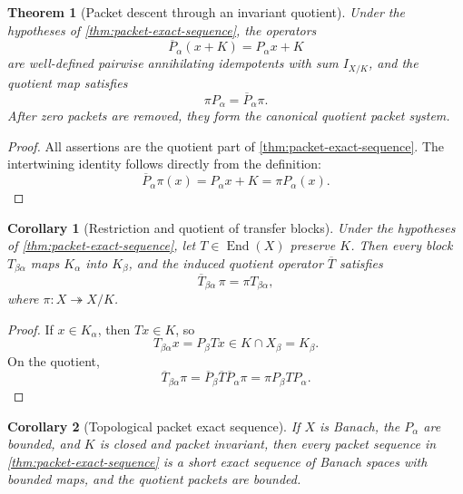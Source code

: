\documentclass[11pt]{article}
\newtheorem{theorem}{Theorem}[section]
\newtheorem{corollary}[corollary]{Corollary}
\theoremstyle{definition}
\theoremstyle{remark}
\theoremstyle{definition}\newtheorem{example}[theorem]{Example}
\newcommand{\End}{\operatorname{End}}
\newcommand{\RecordID}[1]{\label{record:#1}}
\newcommand{\Depends}[1]{}
\begin{document}
\begin{theorem}[Packet descent through an invariant quotient]
\label{thm:quotient-packet-descent}
Under the hypotheses of \cref{thm:packet-exact-sequence}, the operators
\[
\overline P_\alpha(x+K)=P_\alpha x+K
\]
are well-defined pairwise annihilating idempotents with sum $I_{X/K}$, and the quotient map satisfies
\[
\boxed{\pi P_\alpha=\overline P_\alpha\pi.}
\]
After zero packets are removed, they form the canonical quotient packet system.
\end{theorem}
\RecordID{PSC-I-T-QUOTIENT-PACKET-DESCENT}
\Depends{PSC-I-T-PACKET-EXACT-SEQUENCE.}

\begin{proof}
All assertions are the quotient part of \cref{thm:packet-exact-sequence}.  The intertwining identity follows directly from the definition:
\[
\overline P_\alpha\pi(x)=P_\alpha x+K=\pi P_\alpha(x).
\]
\end{proof}

\begin{corollary}[Restriction and quotient of transfer blocks]
\label{cor:block-descent}
Under the hypotheses of \cref{thm:packet-exact-sequence}, let $T\in\End(X)$ preserve $K$.  Then every block $T_{\beta\alpha}$ maps $K_\alpha$ into $K_\beta$, and the induced quotient operator $\overline T$ satisfies
\[
\boxed{
\overline T_{\beta\alpha}\,\pi
=
\pi T_{\beta\alpha},
}
\]
where $\pi:X\twoheadrightarrow X/K$.
\end{corollary}
\RecordID{PSC-I-C-QUOTIENT-PACKET-DESCENT}
\Depends{PSC-I-T-PACKET-EXACT-SEQUENCE.}

\begin{proof}
If $x\in K_\alpha$, then $Tx\in K$, so
\[
T_{\beta\alpha}x=P_\beta Tx\in K\cap X_\beta=K_\beta.
\]
On the quotient,
\[
\overline T_{\beta\alpha}\pi
=
\overline P_\beta\overline T\overline P_\alpha\pi
=
\pi P_\beta TP_\alpha.
\]
\end{proof}

\begin{corollary}[Topological packet exact sequence]
\label{cor:topological-packet-exact-sequence}
If $X$ is Banach, the $P_\alpha$ are bounded, and $K$ is closed and packet invariant, then every packet sequence in \cref{thm:packet-exact-sequence} is a short exact sequence of Banach spaces with bounded maps, and the quotient packets are bounded.
\end{corollary}
\RecordID{PSC-I-C-TOPOLOGICAL-PACKET-EXACT-SEQUENCE}
\Depends{\nolinkurl{PSC-I-T-PACKET-EXACT-SEQUENCE} and
\nolinkurl{PSC-I-T-BANACH-PACKET-ISOMORPHISM}.}
\end{document}
